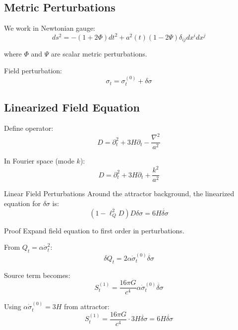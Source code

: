 \documentclass[11pt,a4paper]{article}
\theoremstyle{definition}
\theoremstyle{remark}
\begin{document}
	\subsection{Metric Perturbations}
	
	We work in Newtonian gauge:
	\begin{equation}
		ds^2 = -(1 + 2\Phi)dt^2 + a^2(t)(1 - 2\Psi)\delta_{ij}dx^idx^j
	\end{equation}
	
	where $\Phi$ and $\Psi$ are scalar metric perturbations.
	
	Field perturbation:
	\begin{equation}
		\sigma_t = \sigma_t^{(0)} + \delta\sigma
	\end{equation}
	
	\subsection{Linearized Field Equation}
	
	Define operator:
	\begin{equation}
		D = \partial_t^2 + 3H\partial_t - \frac{\nabla^2}{a^2}
	\end{equation}
	
	In Fourier space (mode $k$):
	\begin{equation}
		D = \partial_t^2 + 3H\partial_t + \frac{k^2}{a^2}
	\end{equation}
	
	Linear Field Perturbations
		Around the attractor background, the linearized equation for $\delta\sigma$ is:
		\begin{equation}\label{eq:linear_field}
			\left(1 - \ell_Q^2 D\right)D\delta\sigma = 6H\dot{\delta\sigma}
		\end{equation}
	
	Proof
		Expand field equation to first order in perturbations.
		
		From $Q_t = \alpha\dot{\sigma}_t^2$:
		\begin{equation}
			\delta Q_t = 2\alpha\dot{\sigma}_t^{(0)}\dot{\delta\sigma}
		\end{equation}
		
		Source term becomes:
		\begin{equation}
			S_t^{(1)} = \frac{16\pi G}{c^4}\alpha\dot{\sigma}_t^{(0)}\dot{\delta\sigma}
		\end{equation}
		
		Using $\alpha\dot{\sigma}_t^{(0)} = 3H$ from attractor:
		\begin{equation}
			S_t^{(1)} = \frac{16\pi G}{c^4} \cdot 3H\dot{\delta\sigma} = 6H\dot{\delta\sigma}
		\end{equation}
		
\end{document}
